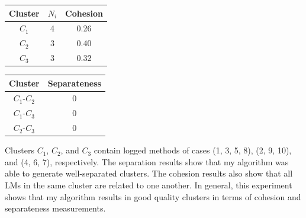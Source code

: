 \begin{minipage}[b]{.40\textwidth}
   \centering
   \begin{tabular}{ ccc}
     {Cluster}&{$N_i$}&{Cohesion}\\
    \toprule
    $C_1$&4& 0.26 \\
    \midrule
    $C_2$&3& 0.40\\
    \midrule
    $C_3$&3& 0.32\\
 	\bottomrule
   \end{tabular}
   \label{tab:cohesion}
\end{minipage}\qquad
\begin{minipage}[b]{.40\textwidth}
   \centering
   \begin{tabular}{ cc}
     {Cluster}&{Separateness}\\
    \toprule
    $C_1$-$C_2$& 0\\
    \midrule
    $C_1$-$C_3$& 0\\
    \midrule
    $C_2$-$C_3$& 0\\
 	\bottomrule 
   \end{tabular}
   \label{tab:separateness}
   
\end{minipage}
            
         
Clusters $C_1$, $C_2$, and $C_3$ contain logged methods of cases (1, 3, 5, 8), (2, 9, 10), and (4, 6, 7), respectively. 
The separation results show that my algorithm was able to generate well-separated clusters.
The cohesion results also show that all LMs in the same cluster are related to one another. In general, this experiment shows that my algorithm results in good quality clusters in terms of cohesion and separateness measurements.



